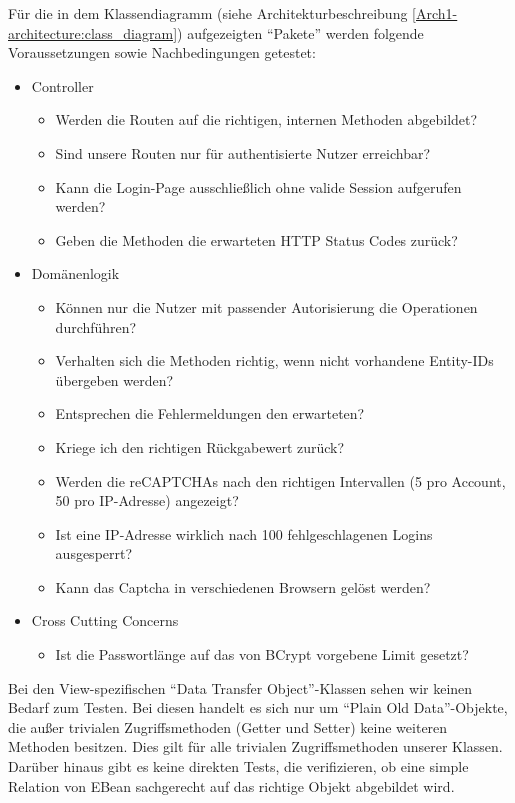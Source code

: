 \documentclass[12pt,DIV14,BCOR10mm,a4paper,parskip=half-,headsepline,headinclude,english,ngerman,bibliography=totocnumbered]{scrreprt}
\begin{document}

Für die in dem Klassendiagramm (siehe Architekturbeschreibung \ref{Arch1-architecture:class_diagram}) aufgezeigten \enquote{Pakete} werden folgende Voraussetzungen sowie Nachbedingungen getestet:

\begin{itemize}
  \item Controller
  \begin{itemize}
    \item Werden die Routen auf die richtigen, internen Methoden abgebildet?
    \item Sind unsere Routen nur für authentisierte Nutzer erreichbar?
    \item Kann die Login-Page ausschließlich ohne valide Session aufgerufen werden?
    \item Geben die Methoden die erwarteten HTTP Status Codes zurück?
  \end{itemize}

  \item Domänenlogik
  \begin{itemize}
    \item Können nur die Nutzer mit passender Autorisierung die Operationen durch\-führen?
    \item Verhalten sich die Methoden richtig, wenn nicht vorhandene Entity-IDs über\-geben werden?
    \item Entsprechen die Fehlermeldungen den erwarteten?
    \item Kriege ich den richtigen Rückgabewert zurück?
    \item Werden die reCAPTCHAs nach den richtigen Intervallen (5 pro Account, 50 pro IP-Adresse) angezeigt?
    \item Ist eine IP-Adresse wirklich nach 100 fehlgeschlagenen Logins ausgesperrt?
    \item Kann das Captcha in verschiedenen Browsern gelöst werden?
  \end{itemize}

  \item Cross Cutting Concerns
  \begin{itemize}
    \item Ist die Passwortlänge auf das von BCrypt vorgebene Limit gesetzt?
  \end{itemize}
\end{itemize}

Bei den View-spezifischen \enquote{Data Transfer Object}-Klassen sehen wir keinen Bedarf zum Testen.
Bei diesen handelt es sich nur um \enquote{Plain Old Data}-Objekte, die außer trivialen Zugriffsmethoden (Getter und Setter) keine weiteren Methoden besitzen.
Dies gilt für alle trivialen Zugriffsmethoden unserer Klassen. \newline
Darüber hinaus gibt es keine direkten Tests, die verifizieren, ob eine simple Relation von EBean sachgerecht auf das richtige Objekt abgebildet wird.
\end{document}
